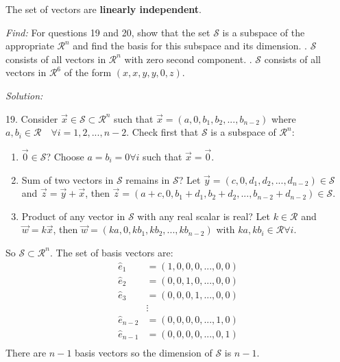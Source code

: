 \documentclass[11pt]{homework}
\begin{document}
The set of vectors are \textbf{linearly independent}.

\newpage
\emph{Find:}
\newline
For questions 19 and 20, show that the set $\mathcal{S}$ is 
a subspace of the appropriate $\mathcal{R}^n$ and find the 
basis for this subspace and its dimension.
\newline
{}. $\mathcal{S}$ consists of all vectors in $\mathcal{R}^n$ 
with zero second component.
. $\mathcal{S}$ consists of all vectors in $\mathcal{R}^6$
of the form $(x, x, y, y, 0, z)$.

\emph{Solution:}

19. Consider $\vec x \in \mathcal{S} \subset \mathcal{R}^n$ 
such that $\vec x = (a, 0, b_1, b_2, ..., b_{n-2})$ where
$ a, b_i \in \mathcal{R} \quad \forall i=1,2,...,n-2$.
Check first that $\mathcal{S}$ is a subspace of $\mathcal{R}^n$:
\begin{enumerate}
  \item $\vec 0 \in \mathcal{S}$?
        Choose $a = b_i = 0 \forall i$ such that $\vec x = \vec 0$.
  \item Sum of two vectors in $\mathcal{S}$ remains in $\mathcal{S}$?
        Let $\vec y = (c, 0, d_1, d_2, ..., d_{n-2}) \in \mathcal{S}$ and 
        $\vec z = \vec y + \vec x$, then
        $\vec z = (a + c, 0, b_1+d_1, b_2+d_2, ..., b_{n-2}+d_{n-2}) \in \mathcal{S}$.
  \item Product of any vector in $\mathcal{S}$ with any real scalar is real?
        Let $k\in \mathcal{R}$ and $ \vec w = k \vec x$, then
        $\vec w = (ka, 0, kb_1, kb_2,...,kb_{n-2})$ with $ ka, kb_i \in \mathcal{R} \forall i$.
\end{enumerate}
So $\mathcal{S} \subset \mathcal{R}^n$.
\newline
The set of basis vectors are:
\begin{align*}
 \hat{e}_1 &= (1, 0, 0, 0, ..., 0, 0) \\
 \hat{e}_2 &= (0, 0, 1, 0, ..., 0, 0) \\
 \hat{e}_3 &= (0, 0, 0, 1, ..., 0, 0) \\
           &\vdots     \\
 \hat{e}_{n-2} &= (0, 0, 0, 0, ..., 1, 0) \\
 \hat{e}_{n-1} &= (0, 0, 0, 0, ..., 0, 1) \\
\end{align*}
There are $n-1$ basis vectors so the dimension of $\mathcal{S}$ is $n-1$.
\end{document}
